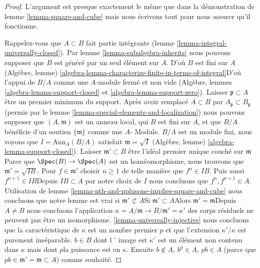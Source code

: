\begin{proof}
L'argument est presque exactement le même que dans la démonstration de lemme \ref{lemma-square-and-cube} mais nous écrivons tout pour nous assurer qu'il fonctionne.

\medskip\noindent

Rappelez-vous que $A \subset B$ fait partie intégrante (lemme \ref{lemma-integral-universally-closed}). Par lemme \ref{lemma-subalgebra-inherits}
nous pouvons supposer que $B$ est généré par un seul élément sur $A$. D'où $B$ est fini sur $A$
(Algèbre, lemme) \ref{algebra-lemma-characterize-finite-in-terms-of-integral}D'où l'appui de $B/A$ comme une $A$-module fermé et non vide (Algèbre, lemmes
\ref{algebra-lemma-support-closed} et \ref{algebra-lemma-support-zero}). Laisser $\mathfrak p \subset A$ être un premier minimum du support. Après avoir remplacé $A \subset B$ par
$A_\mathfrak p \subset B_\mathfrak p$ (permis par le lemme \ref{lemma-special-elements-and-localization}) nous pouvons supposer que $(A, \mathfrak m)$ est un anneau local, qui $B$ est fini sur $A$, et que $B/A$ bénéficie d'un soutien $\{\mathfrak m\}$
comme une $A$- Module. $B/A$ est un module fini, nous voyons que $I = \text{Ann}_A(B/A)$ satisfait $\mathfrak m = \sqrt{I}$
(Algèbre, lemme) \ref{algebra-lemma-support-closed}). Laisser $\mathfrak m' \subset B$ être l'idéal premier unique couché sur
$\mathfrak m$Parce que $\Spec(B) \to \Spec(A)$ est un homéomorphisme, nous trouvons que $\mathfrak m' = \sqrt{IB}$. Pour $f \in \mathfrak m'$ choisir $n \geq 1$ de telle manière que
$f^n \in IB$. Puis aussi $f^{n + 1} \in IB$Depuis $IB \subset A$ par notre choix de $I$ nous concluons que
$f^n, f^{n + 1} \in A$. Utilisation de lemme \ref{lemma-nth-and-nplusone-implies-square-and-cube}
nous concluons que notre lemme est vrai si $\mathfrak m' \not \subset A$Si $\mathfrak m' \subset A$Alors $\mathfrak m' = \mathfrak m$Depuis $A \not = B$ nous concluons l'application
$\kappa = A/\mathfrak m \to B/\mathfrak m' = \kappa'$
des corps résiduels ne peuvent pas être un isomorphisme. \ref{lemma-universally-injective} nous concluons que la caractéristique de $\kappa$ est un nombre premier $p$
et que l'extension $\kappa'/\kappa$ est purement inséparable. $b \in B$ dont l ' image est $\kappa'$ est un élément non contenu dans $\kappa$ mais dont $p$la puissance est en $\kappa$. Ensuite $b \not \in A$, $b^p \in A$, $pb \in A$
(parce que $pb \in \mathfrak m' = \mathfrak m \subset A$) comme souhaité.

\end{proof}


